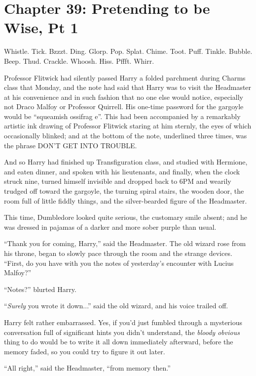 \chapter{Chapter 39: Pretending to be Wise, Pt 1}
Whistle. Tick. Bzzzt. Ding. Glorp. Pop. Splat. Chime. Toot. Puff. Tinkle. Bubble. Beep. Thud. Crackle. Whoosh. Hiss. Pffft. Whirr.

Professor Flitwick had silently passed Harry a folded parchment during Charms class that Monday, and the note had said that Harry was to visit the Headmaster at his convenience and in such fashion that no one else would notice, especially not Draco Malfoy or Professor Quirrell. His one-time password for the gargoyle would be ``squeamish ossifrag e''. This had been accompanied by a remarkably artistic ink drawing of Professor Flitwick staring at him sternly, the eyes of which occasionally blinked; and at the bottom of the note, underlined three times, was the phrase DON'T GET INTO TROUBLE.

And so Harry had finished up Transfiguration class, and studied with Hermione, and eaten dinner, and spoken with his lieutenants, and finally, when the clock struck nine, turned himself invisible and dropped back to 6PM and wearily trudged off toward the gargoyle, the turning spiral stairs, the wooden door, the room full of little fiddly things, and the silver-bearded figure of the Headmaster.

This time, Dumbledore looked quite serious, the customary smile absent; and he was dressed in pajamas of a darker and more sober purple than usual.

``Thank you for coming, Harry,'' said the Headmaster. The old wizard rose from his throne, began to slowly pace through the room and the strange devices. ``First, do you have with you the notes of yesterday's encounter with Lucius Malfoy?''

``Notes?'' blurted Harry.

``\emph{Surely} you wrote it down...'' said the old wizard, and his voice trailed off.

Harry felt rather embarrassed. Yes, if you'd just fumbled through a mysterious conversation full of significant hints you didn't understand, the \emph{bloody obvious} thing to do would be to write it all down immediately afterward, before the memory faded, so you could try to figure it out later.

``All right,'' said the Headmaster, ``from memory then.''

